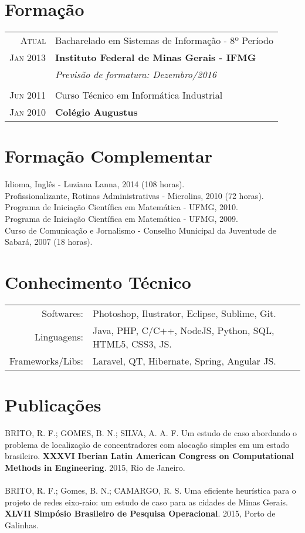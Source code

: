 \documentclass[a4paper,10pt]{article}
\begin{document}
\section{Formação}
\begin{tabular}{r|p{13.1cm}}
	\textsc{Atual} & Bacharelado em Sistemas de Informação - 8º Período\\
	\textsc{Jan 2013} & \textbf{Instituto Federal de Minas Gerais - IFMG}\\
	&\small\emph{Previsão de formatura: Dezembro/2016}\\
	\multicolumn{2}{c}{} \\
	\textsc{Jun 2011}& Curso Técnico em Informática Industrial \\
	\textsc{Jan 2010}& \textbf{Colégio Augustus}
\end{tabular}

\section{Formação Complementar}
Idioma, Inglês - Luziana Lanna, \textsc{2014} (108 horas).\\
Profissionalizante, Rotinas Administrativas - Microlins, \textsc{2010} (72 horas).\\
Programa de Iniciação Científica em Matemática - UFMG, 2010.\\
Programa de Iniciação Científica em Matemática - UFMG, 2009.\\
Curso de Comunicação e Jornalismo - Conselho Municipal da Juventude de Sabará, 2007 (18 horas).

\section{Conhecimento Técnico}
\begin{tabular}{rl}
	Softwares: & Photoshop, Ilustrator, Eclipse, Sublime, Git.\\
	Linguagens: & Java, PHP, C/C++, NodeJS, Python, SQL, HTML5, CSS3, JS.\\
	Frameworks/Libs: & Laravel, QT, Hibernate, Spring, Angular JS.\\
\end{tabular}

\section{Publicações}
BRITO, R. F.; GOMES, B. N.; SILVA, A. A. F. Um estudo de caso abordando o problema de localização de concentradores com alocação simples em um estado brasileiro. \textbf{XXXVI Iberian Latin American Congress on Computational Methods in Engineering}. 2015, Rio de Janeiro.\\ \\
BRITO, R. F.; Gomes, B. N.; CAMARGO, R. S. Uma eficiente heurística para o projeto de redes eixo-raio: um estudo de caso para as cidades de Minas Gerais. \textbf{XLVII Simpósio Brasileiro de Pesquisa Operacional}. 2015, Porto de Galinhas.
\end{document}
